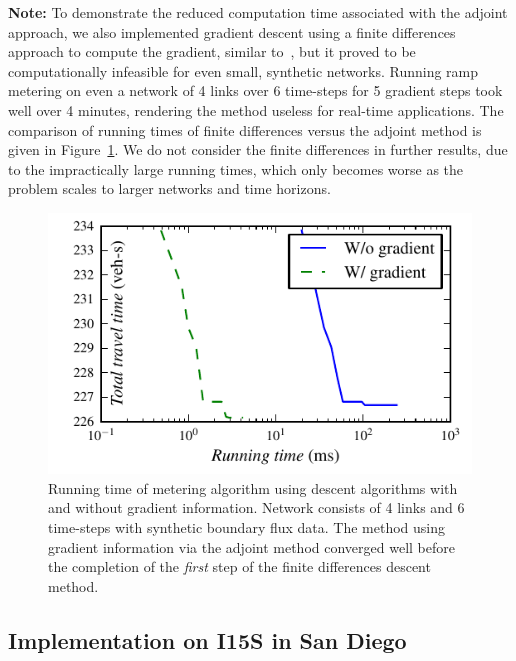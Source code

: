 \textbf{Note: } To demonstrate the reduced computation time associated with the adjoint approach, we also implemented gradient descent using a finite differences approach to compute the gradient, similar to~\cite{Frejo2011,Ramon2013}, but it proved to be computationally infeasible for even small, synthetic
networks. Running ramp metering on even a network of 4 links over
6 time-steps for 5 gradient steps took well over 4 minutes,
rendering the method useless for real-time applications. The comparison
of running times of finite differences versus the adjoint method is given in
Figure~\ref{fig:Running-time-of}. We do not consider the finite differences in further results, due to the impractically large running times, which only becomes worse as the problem scales to larger networks and time horizons.
\begin{figure}
	\begin{centering}
		\includegraphics[width=0.5\columnwidth]{images/itergrad}
		\par\end{centering}
				
		\caption{Running time of metering algorithm using descent algorithms with and without gradient information.
			Network consists of 4 links and 6 time-steps with synthetic boundary
			flux data. The method using gradient information via the adjoint
			method converged well before the completion of the \textit{first} step of the finite differences descent method.
			\label{fig:Running-time-of}}
		\end{figure}
				
				
				
		\subsection{Implementation on I15S in San Diego\label{sub:Network}}
				
